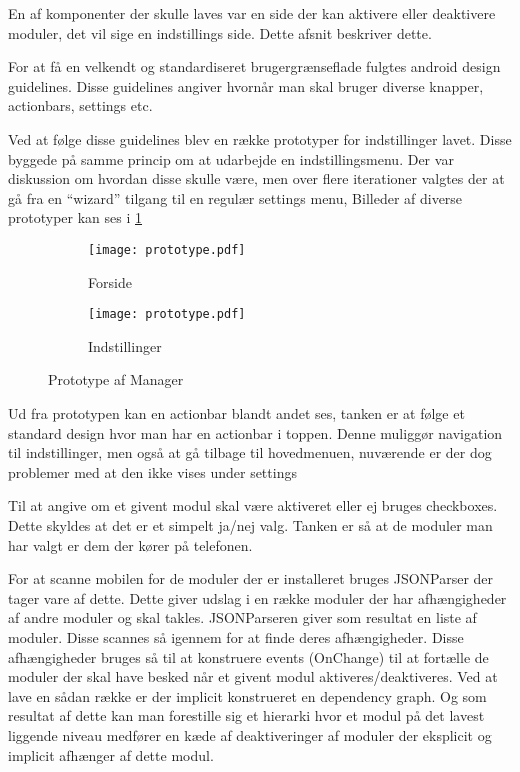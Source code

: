 En af komponenter der skulle laves var en side der kan aktivere eller deaktivere moduler, det vil sige en indstillings side. Dette afsnit beskriver dette.

For at få en velkendt og standardiseret brugergrænseflade fulgtes android design guidelines.
Disse guidelines angiver hvornår man skal bruger diverse knapper, actionbars, settings etc.
\cite{androiddesign}

Ved at følge disse guidelines blev en række prototyper for indstillinger lavet.
Disse byggede på samme princip om at udarbejde en indstillingsmenu.
Der var diskussion om hvordan disse skulle være, men over flere iterationer valgtes der at gå fra en ``wizard'' tilgang til en regulær settings menu,
Billeder af diverse prototyper kan ses i \cref{fig:prototype-manager}

\begin{figure}[!h]
	\centering
	\begin{subfigure}[b]{0.45\textwidth}
			\texttt{[image: prototype.pdf]}
			\caption{Forside}
	\end{subfigure}
	\begin{subfigure}[b]{0.45\textwidth}
			\texttt{[image: prototype.pdf]}
			\caption{Indstillinger}
	\end{subfigure}
	\caption{Prototype af Manager}
	\label{fig:prototype-manager}
\end{figure}


Ud fra prototypen kan en actionbar blandt andet ses, tanken er at følge et standard design hvor man har en actionbar i toppen.
Denne muliggør navigation til indstillinger, men også at gå tilbage til hovedmenuen, nuværende er der dog problemer med at den ikke vises under settings

Til at angive om et givent modul skal være aktiveret eller ej bruges checkboxes.
Dette skyldes at det er et simpelt ja/nej valg. 
Tanken er så at de moduler man har valgt er dem der kører på telefonen.

For at scanne mobilen for de moduler der er installeret bruges JSONParser der tager vare af dette. 
Dette giver udslag i en række moduler der har afhængigheder af andre moduler og skal takles.
JSONParseren giver som resultat en liste af moduler. Disse scannes så igennem for at finde deres afhængigheder.
Disse afhængigheder bruges så til at konstruere events (OnChange) til at fortælle de moduler der skal have besked når et givent modul aktiveres/deaktiveres.
Ved at lave en sådan række er der implicit konstrueret en dependency graph.
Og som resultat af dette kan man forestille sig et hierarki hvor et modul på det lavest liggende niveau medfører en kæde af deaktiveringer af moduler der eksplicit og implicit afhænger af dette modul.

